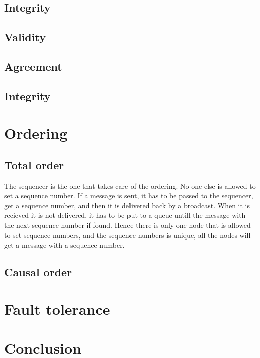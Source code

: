\documentclass{article}
\begin{document}
\subsection{Integrity}
\subsection{Validity}
\subsection{Agreement}
\subsection{Integrity}
\section{Ordering}
\subsection{Total order}
  The sequencer is the one that takes care of the ordering. No one else is allowed to set a sequence number.
  If a message is sent, it has to be passed to the sequencer, get a sequence number, and then it is delivered back
  by a broadcast. When it is recieved it is not delivered, it has to be put to a queue untill the message with the
  next sequence number if found. Hence there is only one node that is allowed to set sequence numbers, and the 
  sequence numbers is unique, all the nodes will get a message with a sequence number.
\subsection{Causal order}
\section{Fault tolerance}
\section{Conclusion}
\end{document}
